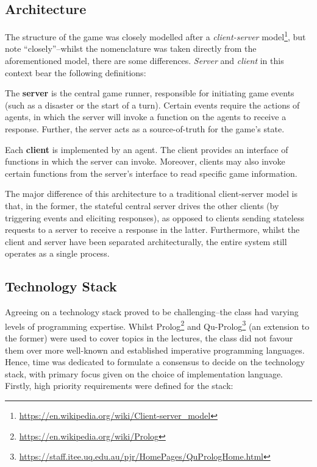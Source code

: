 \subsection{Architecture}
\label{sec:GD:implementation:arch}

The structure of the game was closely modelled after a \emph{client-server} model\footnote{\url{https://en.wikipedia.org/wiki/Client-server_model}}, but note ``closely''--whilst the nomenclature was taken directly from the aforementioned model, there are some differences. \emph{Server} and \emph{client} in this context bear the following definitions:

\begin{definition} \label{def:server}
    The \textbf{server} is the central game runner, responsible for initiating game events (such as a disaster or the start of a turn). Certain events require the actions of agents, in which the server will invoke a function on the agents to receive a response. Further, the server acts as a source-of-truth for the game's state.
\end{definition}


\begin{definition} \label{def:client}
    Each \textbf{client} is implemented by an agent. The client provides an interface of functions in which the server can invoke. Moreover, clients may also invoke certain functions from the server's interface to read specific game information.
\end{definition}

The major difference of this architecture to a traditional client-server model is that, in the former, the stateful central server drives the other clients (by triggering events and eliciting responses), as opposed to clients sending stateless requests to a server to receive a response in the latter. Furthermore, whilst the client and server have been separated architecturally, the entire system still operates as a single process.

\subsection{Technology Stack}
\label{sec:GD:implementation:techstack}

Agreeing on a technology stack proved to be challenging--the class had varying levels of programming expertise. Whilst Prolog\footnote{\url{https://en.wikipedia.org/wiki/Prolog}} and Qu-Prolog\footnote{\url{https://staff.itee.uq.edu.au/pjr/HomePages/QuPrologHome.html}} (an extension to the former) were used to cover topics in the lectures, the class did not favour them over more well-known and established imperative programming languages. Hence, time was dedicated to formulate a consensus to decide on the technology stack, with primary focus given on the choice of implementation language. Firstly, high priority requirements were defined for the stack:

